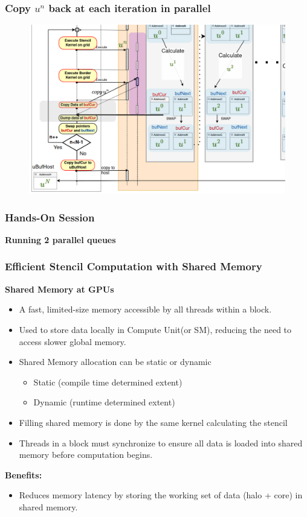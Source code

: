 \documentclass[9pt]{beamer}
\begin{document}
\begin{frame}
\frametitle{Copy $u^{n}$ back at each iteration in parallel}
\begin{figure}
    \centering
    \includegraphics[width=0.8\linewidth]{Screenshot from 2024-09-26 15-05-25.png}
    \label{fig:enter-label}
\end{figure}
\end{frame}


\begin{frame}
\frametitle{Hands-On Session}
\begin{center}
      \Huge \textbf{Running 2 parallel queues}
  \end{center}
\end{frame}


\begin{frame}[fragile]
\frametitle{Efficient Stencil Computation with Shared Memory}
\textbf{Shared Memory at GPUs}
    \begin{itemize}
        \item A fast, limited-size memory accessible by all threads within a block.
        \item Used to store data locally in Compute Unit(or SM), reducing the need to access slower global memory.
        \item Shared Memory allocation can be static or dynamic
        \begin{itemize}
            \item Static (compile time determined extent)
            \item Dynamic (runtime determined extent)
        \end{itemize}
         \item Filling shared memory is done by the same kernel calculating the stencil
         \item Threads in a block must synchronize to ensure all data is loaded into shared memory before computation begins.
   \end{itemize}
  \textbf{Benefits:}
    \begin{itemize}
        \item Reduces memory latency by storing the working set of data (halo + core) in shared memory.
    \end{itemize}
\end{frame}
\end{document}
